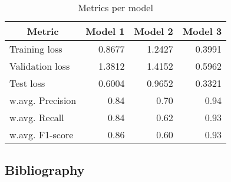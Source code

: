\documentclass[11pt]{article}
\begin{document}
\begin{table}[H]
    \begin{center}
    
    \begin{tabular}{lrrr}
    \multicolumn{1}{c}{\textbf{Metric}} & \multicolumn{1}{c}{\textbf{Model 1}} & 
    \multicolumn{1}{c}{\textbf{Model 2}} & \multicolumn{1}{c}{\textbf{Model 3}}\\ \hline
        Training loss & 0.8677 & 1.2427& 0.3991 \\
        Validation loss  & 1.3812 & 1.4152 & 0.5962\\
        Test loss  & 0.6004 & 0.9652 & 0.3321\\ \hline
        w.avg. Precision & 0.84 & 0.70 & 0.94 \\
        w.avg. Recall & 0.84 & 0.62 & 0.93 \\
        w.avg. F1-score & 0.86 & 0.60 & 0.93\\ \hline
    \end{tabular}
    \caption{Metrics per model} \label{tab:final_results}
    
    \end{center}
\end{table}


\clearpage

\begin{center}
    \section*{Bibliography}
\end{center}

\printbibliography
\end{document}
